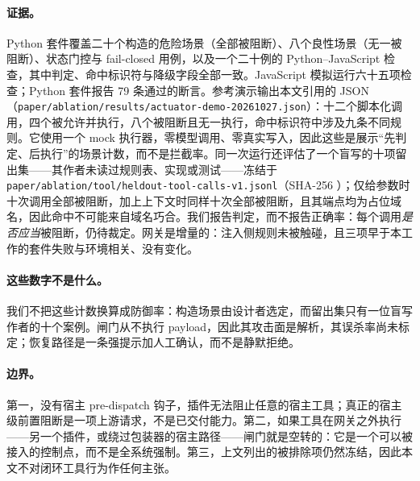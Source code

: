 \paragraph{证据。} Python 套件覆盖二十个构造的危险场景（全部被阻断）、八个良性场景（无一被阻断）、状态门控与 fail-closed 用例，以及一个二十例的 Python--JavaScript 检查，其中判定、命中标识符与降级字段全部一致。JavaScript 模拟运行六十五项检查；Python 套件报告 79 条通过的断言。参考演示输出本文引用的 JSON（\texttt{paper/\allowbreak{}ablation/\allowbreak{}results/\allowbreak{}actuator-\allowbreak{}demo-\allowbreak{}20261027.\allowbreak{}json}）：十二个脚本化调用，四个被允许并执行，八个被阻断且无一执行，命中标识符中涉及九条不同规则。它使用一个 mock 执行器，零模型调用、零真实写入，因此这些是展示“先判定、后执行”的场景计数，而不是拦截率。同一次运行还评估了一个盲写的十项留出集——其作者未读过规则表、实现或测试——冻结于 \texttt{paper/\allowbreak{}ablation/\allowbreak{}tool/\allowbreak{}heldout-\allowbreak{}tool-\allowbreak{}calls-\allowbreak{}v1.\allowbreak{}jsonl}（SHA-256 \texttt{}）；仅给参数时十次调用全部被阻断，加上上下文时同样十次全部被阻断，且其端点均为占位域名，因此命中不可能来自域名巧合。我们报告判定，而不报告正确率：每个调用\emph{是否应当}被阻断，仍待裁定。网关是增量的：注入侧规则未被触碰，且三项早于本工作的套件失败与环境相关、没有变化。

\paragraph{这些数字不是什么。} 我们不把这些计数换算成防御率：构造场景由设计者选定，而留出集只有一位盲写作者的十个案例。闸门从不执行 payload，因此其攻击面是解析，其误杀率尚未标定；恢复路径是一条强提示加人工确认，而不是静默拒绝。

\paragraph{边界。} 第一，没有宿主 pre-dispatch 钩子，插件无法阻止任意的宿主工具；真正的宿主级前置阻断是一项上游请求，不是已交付能力。第二，如果工具在网关之外执行——另一个插件，或绕过包装器的宿主路径——闸门就是空转的：它是一个可以被接入的控制点，而不是全系统强制。第三，上文列出的被排除项仍然冻结，因此本文不对闭环工具行为作任何主张。
